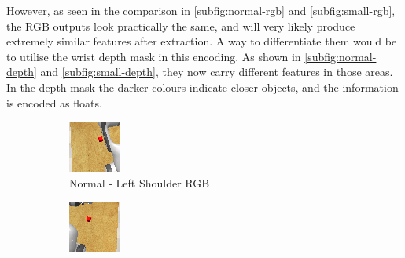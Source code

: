 However, as seen in the comparison in \ref{subfig:normal-rgb} and \ref{subfig:small-rgb}, the RGB outputs look practically the same, and will very likely produce extremely similar features after extraction. A way to differentiate them would be to utilise the wrist depth mask in this encoding. As shown in \ref{subfig:normal-depth} and \ref{subfig:small-depth}, they now carry different features in those areas. In the depth mask the darker colours indicate closer objects, and the information is encoded as floats. 

\begin{figure}[htpb] %
  \centering
  \begin{subfigure}{0.40\linewidth}
    \centering
    \includegraphics[width=0.7\linewidth]{assets/depth-interfacing/normal-l_rgb.png}
    \caption{Normal - Left Shoulder RGB}\label{subfig:normal-l-shoulder}
  \end{subfigure}
  \begin{subfigure}{0.40\linewidth}
    \centering
    \includegraphics[width=0.7\linewidth]{assets/depth-interfacing/normal-r_rgb.png}

\end{subfigure}
\end{figure}
